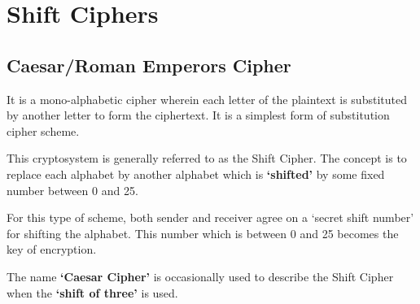 \documentclass[british]{report}
\begin{document}
\section{Shift Ciphers}

\subsection{Caesar/Roman Emperors Cipher}

It is a mono-alphabetic cipher wherein each letter of the plaintext
is substituted by another letter to form the ciphertext. It is a simplest
form of substitution cipher scheme.

This cryptosystem is generally referred to as the Shift Cipher. The
concept is to replace each alphabet by another alphabet which is \textbf{`shifted'}
by some fixed number between 0 and 25.

For this type of scheme, both sender and receiver agree on a `secret
shift number' for shifting the alphabet. This number which is between
0 and 25 becomes the key of encryption.

The name \textbf{`Caesar Cipher'} is occasionally used to describe
the Shift Cipher when the \textbf{`shift of three'} is used.
\end{document}
